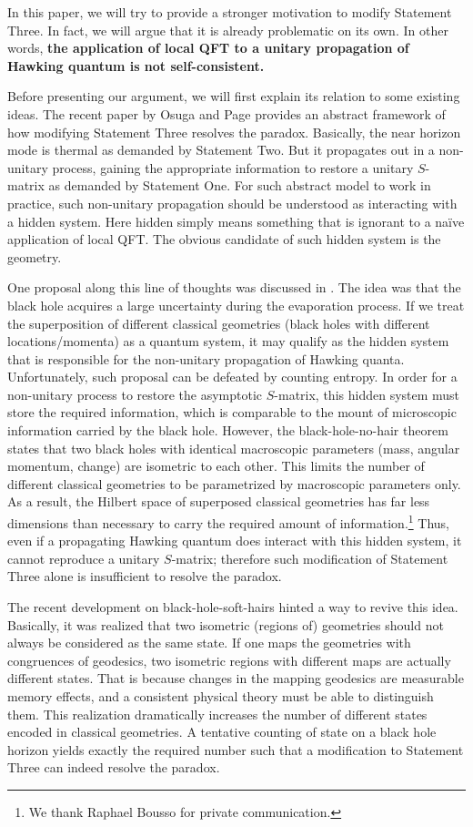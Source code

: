 \documentclass[aps,showpacs,twocolumn,floats,prd,superscriptaddress,nofootinbib]{revtex4-1}
\begin{document}
In this paper, we will try to provide a stronger motivation to modify Statement Three. 
In fact, we will argue that it is already problematic on its own. 
In other words, {\bf the application of local QFT to a unitary propagation of Hawking quantum is not self-consistent. } 

Before presenting our argument, we will first explain its relation to some existing ideas.
The recent paper by Osuga and Page \cite{OsuPag16} provides an abstract framework of how modifying Statement Three resolves the paradox.
Basically, the near horizon mode is thermal as demanded by Statement Two.
But it propagates out in a non-unitary process, gaining the appropriate information to restore a unitary $S$-matrix as demanded by Statement One. 
For such abstract model to work in practice, such non-unitary propagation should be understood as interacting with a hidden system.
Here hidden simply means something that is ignorant to a na\"ive application of local QFT.
The obvious candidate of such hidden system is the geometry.

One proposal along this line of thoughts was discussed in \cite{NomVar12}. 
The idea was that the black hole acquires a large uncertainty during the evaporation process. 
If we treat the superposition of different classical geometries (black holes with different locations/momenta) as a quantum system, it may qualify as the hidden system that is responsible for the non-unitary propagation of Hawking quanta. 
Unfortunately, such proposal can be defeated by counting entropy.
In order for a non-unitary process to restore the asymptotic $S$-matrix, this hidden system must store the required information, which is comparable to the mount of microscopic information carried by the black hole.
However, the black-hole-no-hair theorem states that two black holes with identical macroscopic parameters (mass, angular momentum, change) are isometric to each other. 
This limits the number of different classical geometries to be parametrized by macroscopic parameters only.
As a result, the Hilbert space of superposed classical geometries has far less dimensions than necessary to carry the required amount of information.\footnote{We thank Raphael Bousso for private communication.}
Thus, even if a propagating Hawking quantum does interact with this hidden system, it cannot reproduce a unitary $S$-matrix; therefore such modification of Statement Three alone is insufficient to resolve the paradox.

The recent development on black-hole-soft-hairs \cite{HawPer16} hinted a way to revive this idea.
Basically, it was realized that two isometric (regions of) geometries should not always be considered as the same state.
If one maps the geometries with congruences of geodesics, two isometric regions with different maps are actually different states.
That is because changes in the mapping geodesics are measurable memory effects, and a consistent physical theory must be able to distinguish them.
This realization dramatically increases the number of different states encoded in classical geometries.
A tentative counting of state on a black hole horizon yields exactly the required number such that a modification to Statement Three can indeed resolve the paradox.
\end{document}
